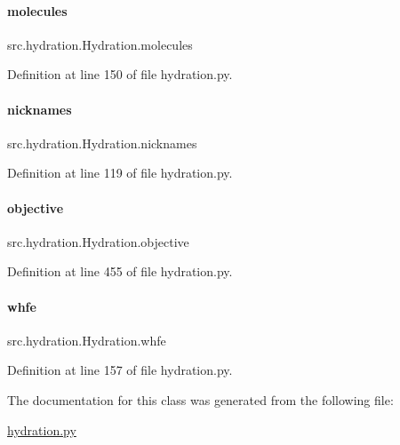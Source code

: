 \paragraph{\texorpdfstring{molecules}{molecules}}
{\footnotesize\ttfamily src.\+hydration.\+Hydration.\+molecules}



Definition at line 150 of file hydration.\+py.

\mbox{\label{classsrc_1_1hydration_1_1Hydration_a721881a1e18fc304f04ef00f2611985f}} 
\paragraph{\texorpdfstring{nicknames}{nicknames}}
{\footnotesize\ttfamily src.\+hydration.\+Hydration.\+nicknames}



Definition at line 119 of file hydration.\+py.

\mbox{\label{classsrc_1_1hydration_1_1Hydration_a30d497d5cfd6b84611b5a4dbfe702ef8}} 
\paragraph{\texorpdfstring{objective}{objective}}
{\footnotesize\ttfamily src.\+hydration.\+Hydration.\+objective}



Definition at line 455 of file hydration.\+py.

\mbox{\label{classsrc_1_1hydration_1_1Hydration_ab5c9e3135020a9cfbb6e40932d52d939}} 
\paragraph{\texorpdfstring{whfe}{whfe}}
{\footnotesize\ttfamily src.\+hydration.\+Hydration.\+whfe}



Definition at line 157 of file hydration.\+py.



The documentation for this class was generated from the following file\+:\begin{DoxyCompactItemize}
\item 
\hyperlink{hydration_8py}{hydration.\+py}\end{DoxyCompactItemize}
